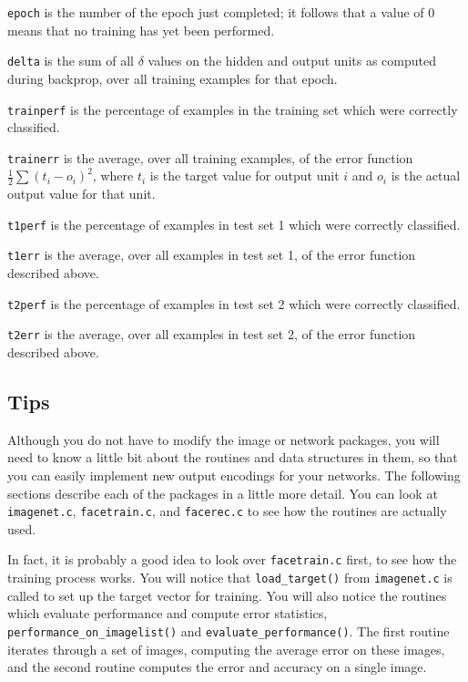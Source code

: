 \begin{description}
\item {\tt epoch} is the number of the epoch just completed; it follows
that a value of 0 means that no training has yet been performed.

\item {\tt delta} is the sum of all $\delta$ values on the hidden and
output units as computed during backprop, over all training examples
for that epoch.

\item {\tt trainperf} is the percentage of examples in the training set
which were correctly classified.

\item {\tt trainerr} is the average, over all training examples,
of the error function $\frac{1}{2} \sum (t_{i} - o_{i})^{2}$, where
$t_{i}$ is the target value for output unit $i$ and $o_{i}$ is the actual
output value for that unit.

\item {\tt t1perf} is the percentage of examples in test set 1
which were correctly classified.

\item {\tt t1err} is the average, over all examples in test set 1,
of the error function described above.

\item {\tt t2perf} is the percentage of examples in test set 2
which were correctly classified.

\item {\tt t2err} is the average, over all examples in test set 2,
of the error function described above.
\end{description}

\subsection{Tips}

Although you do not have to modify the image or network packages,
you will need to know a little bit about the routines and data structures
in them, so that you can easily implement new output encodings for
your networks.  The following sections describe each of the packages
in a little more detail.  You can look at {\tt imagenet.c},
{\tt facetrain.c}, and {\tt facerec.c} to see how the routines are
actually used.  

In fact, it is probably a good idea to look over {\tt facetrain.c}
first, to see how the training process works.  You will notice
that {\tt load\_target()} from {\tt imagenet.c} is called to set
up the target vector for training.  You will also notice the
routines which evaluate performance and compute error statistics,
{\tt performance\_on\_imagelist()} and {\tt evaluate\_performance()}.
The first routine iterates through a set of images, computing the
average error on these images, and the second routine computes
the error and accuracy on a single image.

